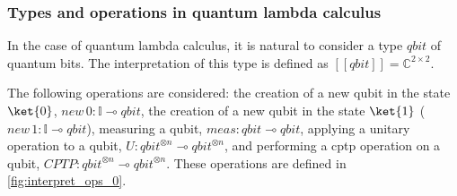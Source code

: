 \subsubsection{Types and operations in quantum lambda calculus}

In the case of quantum lambda calculus, it is natural to consider a type $\textit{qbit}$ of quantum bits.  The interpretation of this type is defined as $[\![\textit{qbit}]\!]=\mathbb{C}^{2\times 2}$. 

The following operations are considered: the creation of a new qubit in the state $\ket{0}$, $\textit{new} \hspace{2pt} 0 :\mathbb{I} \multimap \textit{qbit}$, the creation of a new qubit in the state $\ket{1}$ ($\textit{new} \hspace{2pt} 1 :\mathbb{I} \multimap \textit{qbit}$), measuring a qubit, $\textit{meas}: \textit{qbit} \multimap \textit{qbit}$, applying a unitary operation to a qubit, $\textit{U}: \textit{qbit}^{\otimes n} \multimap \textit{qbit}^{\otimes n}$, and performing a \acrshort{cptp} operation on a qubit, $\textit{CPTP}: \textit{qbit}^{\otimes n} \multimap \textit{qbit}^{\otimes n}$. These operations are defined in \autoref{fig:interpret_ops_0}.


